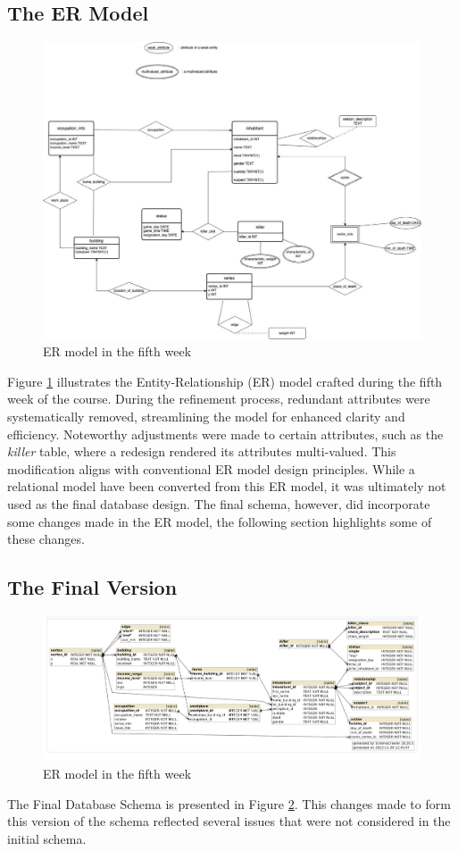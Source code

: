 \documentclass{article}
\begin{document}
\subsection{The ER Model}
\begin{figure}
  \centering
  \includegraphics[width=1\textwidth]{ER_model.jpg}
  \caption{ER model in the fifth week}
  \label{fig: ER Model}
\end{figure}
Figure \ref{fig: ER Model} illustrates the Entity-Relationship (ER) model crafted during the fifth week of the course. During the refinement process, redundant attributes were systematically removed, streamlining the model for enhanced clarity and efficiency. Noteworthy adjustments were made to certain attributes, such as the \textit{killer} table, where a redesign rendered its attributes multi-valued. This modification aligns with conventional ER model design principles. While a relational model have been converted from this ER model, it was ultimately not used as the final database design. The final schema, however, did incorporate some changes made in the ER model, the following section highlights some of these changes.

\subsection{The Final Version}
\begin{figure}
  \centering
  \includegraphics[width=1\textwidth]{Final_Database_Schema.png}
  \caption{ER model in the fifth week}
  \label{fig: Final Database Schema}
\end{figure}
The Final Database Schema is presented in Figure \ref{fig: Final Database Schema}. This changes made to form this version of the schema reflected several issues that were not considered in the initial schema.
\end{document}
